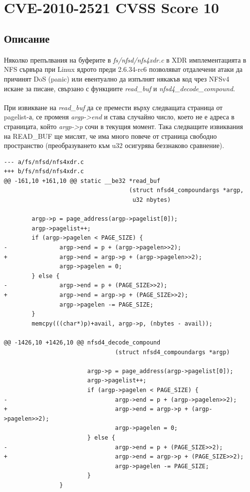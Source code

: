 \documentclass[a4paper,12pt,leqno]{article}
\begin{document}
\section{CVE-2010-2521 CVSS Score 10}
\subsection{Описание}
\paragraph{}
Няколко препълвания на буферите в \textit{fs/nfsd/nfs4xdr.c} в XDR имплементацията в NFS сървъра при Linux ядрото преди 2.6.34-rc6 позволяват отдалечени атаки да причинят DoS (panic) или евентуално да изпълнят някакъв код чрез NFSv4 искане за писане, свързано с функциите \textit{read\_buf} и \textit{nfsd4\_decode\_compound}. 
\paragraph{}
При извикване на \textit{read\_buf} да се премести върху следващата страница от pagelist-а, се променя \textit{argp->end} и става случайно число, което не е адреса в страницата, който \textit{argp->p} сочи в текущия момент. Така следващите извиквания на READ\_BUF ще мислят, че има много повече от страница свободно пространство (преобразуването към u32 осигурява беззнаково сравнение).
\begin{verbatim}
--- a/fs/nfsd/nfs4xdr.c
+++ b/fs/nfsd/nfs4xdr.c
@@ -161,10 +161,10 @@ static __be32 *read_buf
                                    (struct nfsd4_compoundargs *argp,
                                     u32 nbytes)
                                     
        argp->p = page_address(argp->pagelist[0]);
        argp->pagelist++;
        if (argp->pagelen < PAGE_SIZE) {
-               argp->end = p + (argp->pagelen>>2);
+               argp->end = argp->p + (argp->pagelen>>2);
                argp->pagelen = 0;
        } else {
-               argp->end = p + (PAGE_SIZE>>2);
+               argp->end = argp->p + (PAGE_SIZE>>2);
                argp->pagelen -= PAGE_SIZE;
        }
        memcpy(((char*)p)+avail, argp->p, (nbytes - avail));

@@ -1426,10 +1426,10 @@ nfsd4_decode_compound
                                (struct nfsd4_compoundargs *argp)
                                
                        argp->p = page_address(argp->pagelist[0]);
                        argp->pagelist++;
                        if (argp->pagelen < PAGE_SIZE) {
-                               argp->end = p + (argp->pagelen>>2);
+                               argp->end = argp->p + (argp->pagelen>>2);
                                argp->pagelen = 0;
                        } else {
-                               argp->end = p + (PAGE_SIZE>>2);
+                               argp->end = argp->p + (PAGE_SIZE>>2);
                                argp->pagelen -= PAGE_SIZE;
                        }
                }
\end{verbatim}
\end{document}
